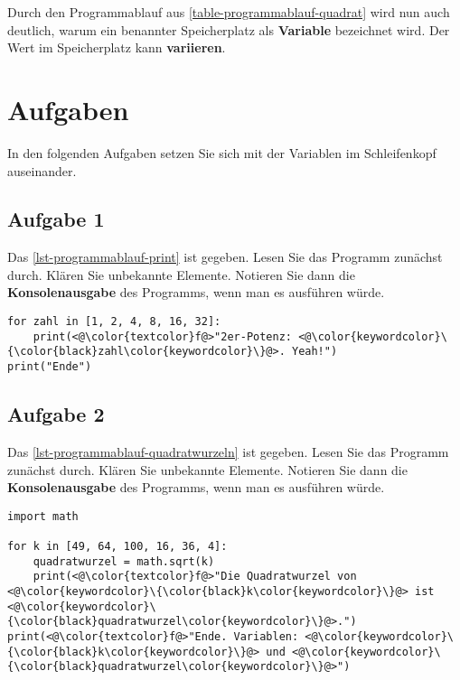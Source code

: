 \begin{example}
\begin{table}[htb]
\begin{minipage}{0.45\textwidth}
\end{minipage}
\end{table}

Durch den Programmablauf aus \autoref{table-programmablauf-quadrat} wird nun auch deutlich, warum ein benannter Speicherplatz als \textbf{Variable} bezeichnet wird. Der Wert im Speicherplatz kann \textbf{variieren}.

\end{example}

\section{Aufgaben}

In den folgenden Aufgaben setzen Sie sich mit der Variablen im Schleifenkopf auseinander.

\subsection{Aufgabe 1}

Das \autoref{lst-programmablauf-print} ist gegeben. Lesen Sie das Programm zunächst durch. Klären Sie unbekannte Elemente. Notieren Sie dann die \textbf{Konsolenausgabe} des Programms, wenn man es ausführen würde.

\begin{lstlisting}[caption={Das Programm erzeugt eine Ausgabe in der Konsole.}, label={lst-programmablauf-print}]
for zahl in [1, 2, 4, 8, 16, 32]:
    print(<@\color{textcolor}f@>"2er-Potenz: <@\color{keywordcolor}\{\color{black}zahl\color{keywordcolor}\}@>. Yeah!")
print("Ende")
\end{lstlisting}

\fillwithgrid{2in}

\subsection{Aufgabe 2}

Das \autoref{lst-programmablauf-quadratwurzeln} ist gegeben. Lesen Sie das Programm zunächst durch. Klären Sie unbekannte Elemente. Notieren Sie dann die \textbf{Konsolenausgabe} des Programms, wenn man es ausführen würde.

\begin{lstlisting}[caption={Das Programm berechnet die Quadratwurzeln der vorgegebenen Zahlen.}, label={lst-programmablauf-quadratwurzeln}]
import math

for k in [49, 64, 100, 16, 36, 4]:
    quadratwurzel = math.sqrt(k)
    print(<@\color{textcolor}f@>"Die Quadratwurzel von <@\color{keywordcolor}\{\color{black}k\color{keywordcolor}\}@> ist <@\color{keywordcolor}\{\color{black}quadratwurzel\color{keywordcolor}\}@>.")
print(<@\color{textcolor}f@>"Ende. Variablen: <@\color{keywordcolor}\{\color{black}k\color{keywordcolor}\}@> und <@\color{keywordcolor}\{\color{black}quadratwurzel\color{keywordcolor}\}@>")
\end{lstlisting}

